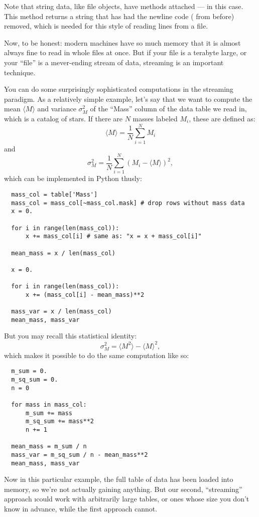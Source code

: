 \documentclass[letterpaper, 12pt, titlepage, twoside]{article}
\begin{document}
Note that string data, like file objects, have methods attached ---
 in this case. This method returns a string that has had the
newline code ( from before) removed, which is needed for
this style of reading lines from a file.

Now, to be honest: modern machines have so much memory that it is almost
always fine to read in whole files at once. But if your file is a terabyte
large, or your ``file'' is a \i{never-ending} stream of data, streaming is an
important technique.

You can do some surprisingly sophisticated computations in the streaming
paradigm. As a relatively simple example, let's say that we want to compute
the mean $\langle M\rangle$ and variance $\sigma^2_M$ of the ``Mass'' column
of the data table we read in, which is a catalog of stars. If there are $N$
masses labeled $M_i$, these are defined as:
\[
\langle M\rangle = \frac{1}{N} \sum_{i = 1}^N M_i
\]
and
\[
\sigma^2_M = \frac{1}{N} \sum_{i = 1}^N (M_i - \langle M\rangle)^2,
\]
which can be implemented in Python thusly:

\begin{lstlisting}
  mass_col = table['Mass']
  mass_col = mass_col[~mass_col.mask] # drop rows without mass data
  x = 0.

  for i in range(len(mass_col)):
      x += mass_col[i] # same as: "x = x + mass_col[i]"

  mean_mass = x / len(mass_col)

  x = 0.

  for i in range(len(mass_col)):
      x += (mass_col[i] - mean_mass)**2

  mass_var = x / len(mass_col)
  mean_mass, mass_var
\end{lstlisting}

But you may recall this statistical identity:
\[
\sigma^2_M = \langle M^2\rangle - \langle M\rangle^2,
\]
which makes it possible to do the same computation like so:

\begin{lstlisting}
  m_sum = 0.
  m_sq_sum = 0.
  n = 0

  for mass in mass_col:
      m_sum += mass
      m_sq_sum += mass**2
      n += 1

  mean_mass = m_sum / n
  mass_var = m_sq_sum / n - mean_mass**2
  mean_mass, mass_var
\end{lstlisting}

Now in this particular example, the full table of data has been loaded into
memory, so we're not actually gaining anything. But our second, ``streaming''
approach \i{could} work with arbitrarily large tables, or ones whose size you
don't know in advance, while the first approach cannot.
\end{document}
